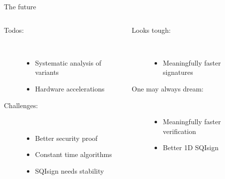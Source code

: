 \documentclass[aspectratio=169]{beamer}
\begin{document}
\begin{frame}{The future}
  \begin{columns}
    \begin{column}{0.5\textwidth}
      \begin{description}
      \item[Todos:]\
        \begin{itemize}
        \item Systematic analysis of variants
        \item Hardware accelerations
        \end{itemize}
      \item[Challenges:]\
        \begin{itemize}
        \item Better security proof
        \item Constant time algorithms
        \item SQIsign needs stability
        \end{itemize}
      \end{description}
    \end{column}
    \begin{column}{0.5\textwidth}
      \begin{description}
      \item[Looks tough:]\
        \begin{itemize}
        \item Meaningfully faster signatures
        \end{itemize}
      \item[One may always dream:]\
        \begin{itemize}
        \item Meaningfully faster verification
        \item Better 1D SQIsign
        \end{itemize}
      \end{description}
    \end{column}
  \end{columns}
\end{frame}
\end{document}

